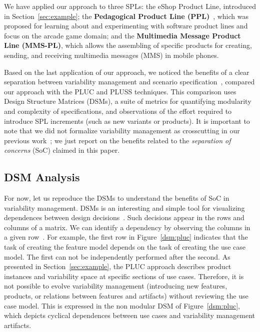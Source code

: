 \documentclass{acm_proc_article-sp}
\begin{document}
We have applied our approach to three SPLs: the eShop Product Line, introduced in Section~\ref{sec:example}; the  
{\bf Pedagogical Product Line (PPL)}~\cite{ppl-url}, which was proposed for learning about and experimenting with software product lines and focus on the arcade game domain; and the 
{\bf Multimedia Message Product Line (MMS-PL)}, which allows the assembling of specific products for creating, sending, and receiving multimedia messages (MMS) in mobile phones.

Based on the last application of our approach, we noticed the benefits of a clear separation between variability management and scenario specification~\cite{rbonifacio-ea-2008}, compared our approach with the PLUC and PLUSS techniques. This comparison uses Design Structure Matrices (DSMs), a suite of metrics for quantifying modularity and complexity of specifications, and observations of the effort required to introduce SPL increments (such as new variants or products). It is important to note that we did not formalize variability management as crosscutting in our previous work~\cite{rbonifacio-ea-2008}; we just report on the benefits related to the \emph{separation of concerns} (SoC) claimed in this paper.

\subsection{DSM Analysis}
For now, let us reproduce the DSMs to understand the benefits of SoC in variability management. DSMs is an interesting and simple tool for visualizing dependences between design decisions~\cite{clark-design-rules-book}. Such decisions appear in the rows and columns of a matrix. We can identify a dependency by observing the columns in a given row~\cite{clark-design-rules-book}. For example, the first row in Figure~\ref{dsm:pluc} indicates that the task of creating the feature model depends on the task of creating the use case model. The first can not be independently performed after the second. As presented in Section~\ref{sec:example}, the PLUC approach describes product instances and variability space at specific sections of use cases. Therefore, it is not possible to evolve variability management (introducing new features, products, or relations between features and artifacts) without reviewing the use case model.  This is expressed in the non modular DSM of Figure~\ref{dsm:pluc}, which depicts cyclical dependences between use cases and variability management artifacts. 
\end{document}
